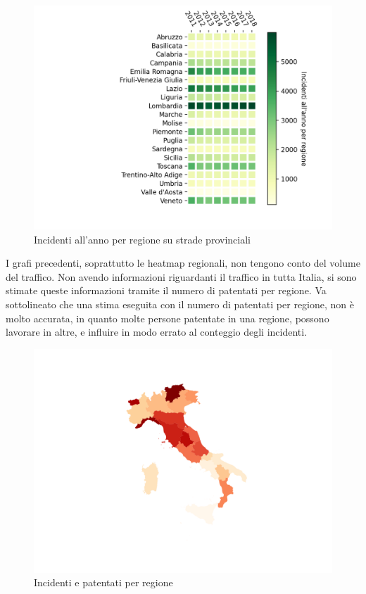 \documentclass[a4paper,12pt]{report}
\begin{document}
\begin{figure}
    \includegraphics[width=\linewidth]{../src/incidenti/incidenti_aci/mappe_regioni/regioni_heatmap.png}
    \caption{Incidenti all'anno per regione su strade provinciali}
    \label{fig:regione-heatmap}
\end{figure}

I grafi precedenti, soprattutto le heatmap regionali, non tengono conto del 
volume del traffico.
Non avendo informazioni riguardanti il traffico in tutta Italia, si sono stimate 
queste informazioni tramite il numero di patentati per regione.
Va sottolineato che una stima eseguita con il numero di patentati per regione, 
non è molto accurata, in quanto molte persone patentate in una regione, possono 
lavorare in altre, e influire in modo errato al conteggio degli incidenti. 

\begin{figure}
    \hfill\includegraphics[width=\linewidth]{../src/incidenti/incidenti_aci/mappe_regioni/incidenti_patenti_italia.png}\hspace*{\fill}
    \caption{Incidenti e patentati per regione}
    \label{fig:incidenti-patentati}
\end{figure}
\end{document}
